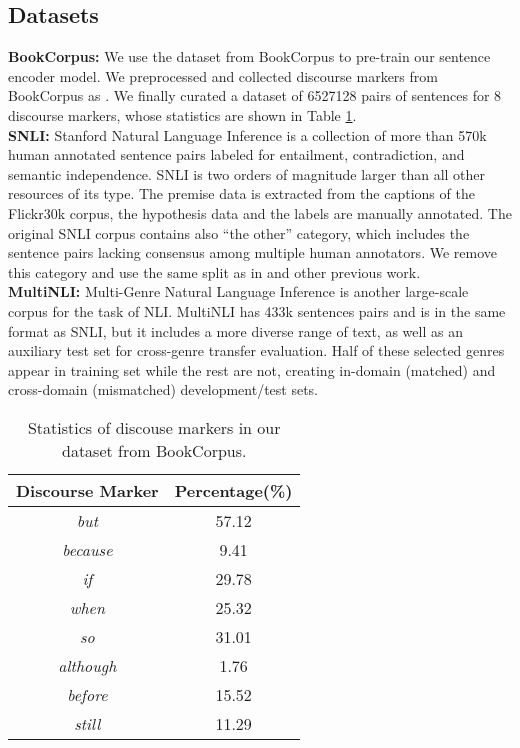 \documentclass[11pt,letterpaper]{article}
\begin{document}
\subsection{Datasets}
\textbf{BookCorpus: }We use the dataset from BookCorpus\cite{zhu2015aligning} to pre-train our sentence encoder model. We preprocessed and collected discourse markers from BookCorpus as \cite{nie2017dissent}. We finally curated a dataset of 6527128 pairs of sentences for 8 discourse markers, whose statistics are shown in Table \ref{tab3}.\\
\textbf{SNLI: }Stanford Natural Language Inference\cite{bowman2015large} is a collection of more than 570k  human annotated sentence pairs labeled for entailment, contradiction, and semantic independence. SNLI is two orders of magnitude larger than all other resources of its type. The premise data is extracted from the captions of the Flickr30k corpus\cite{young2014image}, the hypothesis data and the labels are manually annotated. The original SNLI corpus contains also “the other” category, which includes the sentence pairs lacking consensus among multiple human annotators. We remove this category and use the same split as in \cite{bowman2015large} and other previous work.\\
\textbf{MultiNLI: } Multi-Genre Natural Language Inference\cite{williams2017broad} is another large-scale corpus for the task of NLI. MultiNLI has 433k sentences pairs and is in the same format as SNLI, but it includes a more diverse range of text, as well as an auxiliary test set for cross-genre transfer evaluation. Half of these selected genres appear in training set while the rest are not, creating in-domain (matched) and cross-domain (mismatched) development/test sets. 

\begin{table}[t]
	\begin{center}
		\begin{tabular}{c|c}
			\toprule
			\textbf{Discourse Marker} &  \textbf{Percentage(\%)} \\
			\midrule
			\emph{but}  & 57.12 \\ 
			\emph{because}  & 9.41 \\ 
			\emph{if}  & 29.78 \\ 
			\emph{when}  & 25.32 \\ 
			\emph{so}  & 31.01 \\ 
			\emph{although}  & 1.76 \\ 
			\emph{before}  & 15.52 \\ 
			\emph{still}  & 11.29 \\ 
			\bottomrule
		\end{tabular}
		\vspace{2mm}
	\end{center}
	\caption{\label{tab3} Statistics of discouse markers in our dataset from BookCorpus.}       
\end{table}
\end{document}
